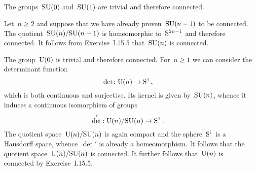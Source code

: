 \subsection{}

The groups~$\mathrm{SU}(0)$ and~$\mathrm{SU}(1)$ are trivial and therefore connected.

Let~$n ≥ 2$ and suppose that we have already proven~$\mathrm{SU}(n - 1)$ to be connected.
The quotient~$\mathrm{SU}(n) / \mathrm{SU}(n - 1)$ is homeomorphic to~$\mathrm{S}^{2n - 1}$ and therefore connected.
It follows from Exercise~I.15.5 that~$\mathrm{SU}(n)$ is connected.

The group~$\mathrm{U}(0)$ is trivial and therefore connected.
For~$n ≥ 1$ we can consider the determinant function
\[
	\det \colon \mathrm{U}(n) \to \mathrm{S}^1 \,,
\]
which is both continuous and surjective.
Its kernel is given by~$\mathrm{SU}(n)$, whence it induces a continuous isomorphism of groups
\[
	\det' \colon \mathrm{U}(n) / \mathrm{SU}(n) \to \mathrm{S}^1 \,.
\]
The quotient space~$\mathrm{U}(n) / \mathrm{SU}(n)$ is again compact and the sphere~$\mathrm{S}^1$ is a Hausdorff space, whence~$\det'$ is already a homeomorphism.
It follows that the quotient space~$\mathrm{U}(n) / \mathrm{SU}(n)$ is connected.
It further follows that~$\mathrm{U}(n)$ is connected by Exercise~I.15.5.
